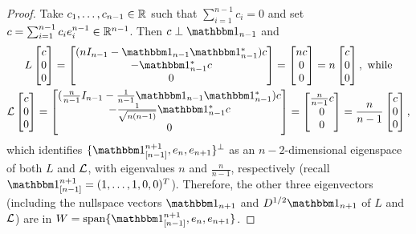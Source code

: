 \begin{proof}
  Take $c_1, \ldots, c_{n - 1} \in \mathbb{R}$ such that $\sum_{i = 1}^{n - 1} c_i = 0$ and set $c = \sum_{i = 1}^{n - 1} c_i e_i^{n - 1} \in \mathbb{R}^{n - 1}$.  Then $c \perp \one_{n - 1}$ and
  \begin{gather*}
    L \begin{bmatrix} c \\ 0 \\ 0 \end{bmatrix} = \begin{bmatrix} (n I_{n - 1} - \one_{n - 1} \one_{n - 1}^*) c \\ -\one_{n - 1}^* c \\ 0 \end{bmatrix} = \begin{bmatrix} n c \\ 0 \\ 0 \end{bmatrix} = n \begin{bmatrix} c \\ 0 \\ 0 \end{bmatrix}, \ \text{while} \\
    \Lc \begin{bmatrix} c \\ 0 \\ 0 \end{bmatrix} = \begin{bmatrix} (\frac{n}{n - 1} I_{n - 1} - \frac{1}{n - 1} \one_{n - 1} \one_{n - 1}^*) c \\ -\frac{1}{\sqrt{n(n - 1)}} \one_{n - 1}^* c \\ 0 \end{bmatrix} = \begin{bmatrix} \frac{n}{n - 1} c \\ 0 \\ 0 \end{bmatrix} = \frac{n}{n - 1} \begin{bmatrix} c \\ 0 \\ 0 \end{bmatrix},
  \end{gather*}
  which identifies $\{\one_{[n - 1]}^{n + 1}, e_n, e_{n + 1}\}^\perp$ as an $n - 2$-dimensional eigenspace of both $L$ and $\mathcal{L}$, with eigenvalues $n$ and $\frac{n}{n - 1}$, respectively (recall $\one_{[n - 1]}^{n + 1} = (1, \ldots, 1, 0, 0)^T$).  Therefore, the other three eigenvectors (including the nullspace vectors $\one_{n + 1}$ and $D^{1 / 2}\one_{n + 1}$ of $L$ and $\mathcal{L}$) are in $W = \Span\{\one_{[n - 1]}^{n + 1}, e_n, e_{n + 1}\}$.


\end{proof}
